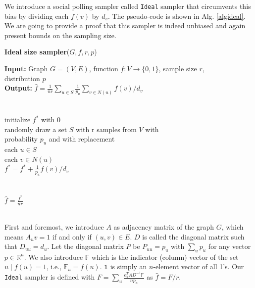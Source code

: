 We introduce a social polling sampler called \texttt{Ideal} sampler that circumvents this bias by dividing each $f(v)$ by $d_v$. The pseudo-code is shown in Alg. \ref{algideal}.
We are going to provide a proof that this sampler is indeed unbiased and again present bounds on the sampling size.
\begin{algorithm*}[!htb]
\caption{\small {\bf Ideal size sampler}($G, f, r, p$)}
\begin{code}
{\bf Input:} Graph $G=(V,E)$, function $f : V \rightarrow \{0,1\}$, sample size $r$,\\ distribution $p$ \\
{\bf Output:} $\hat{f}=\frac{1}{nr}\sum\nolimits_{u\in S}\frac{1}{p_u}\sum\nolimits_{v\in N(u)} f(v)/d_v$\\
\\
\uln \>\ubegin\\
\uln \>\>initialize $f^*$ with 0 \\
\uln \>\>randomly draw a set $S$ with r samples from $V$ with\\
\>   \>\>probability $p_u$ and with replacement\\
\uln \>\>\ufor each $u \in S$ \udo\\
\uln \>\>\>\ufor each $v \in N(u)$ \udo\\
\uln \>\>\>\>$f^* = f^* + \frac{1}{p_u}f(v)/d_v$ \\
\uln \>\>\>\uend\\
\uln \>\>\uend\\
\uln \>\ureturn $\hat{f} = \frac{f^*}{nr}$ \\
\uln \>\uend\\ 
\end{code}
\label{algideal}
\end{algorithm*}

First and foremost, we introduce $A$ as adjacency matrix of the graph $G$, which means $A_uv = 1$ if and only if $(u,v) \in E$. $D$ is called the diagonal matrix such that $D_{uu} = d_u$.
Let the diagonal matrix $P$ be $P_{uu} = p_u$ with $\sum\nolimits_{u}p_u$ for any vector $p \in \mathbb{R}^n$.
We also introduce $\mathds{F}$ which is the indicator (column) vector of the set ${u\;|\;f(u)=1}$, i.e., $\mathds{F}_u=f(u)$.
$\mathds{1}$ is simply an $n$-element vector of all 1's.
Our \texttt{Ideal} sampler is defined with $F = \sum_{u}\frac{e_u^TAD^{-1}\mathds{F}}{np_u}$ as $\hat{f} = F/r$.

